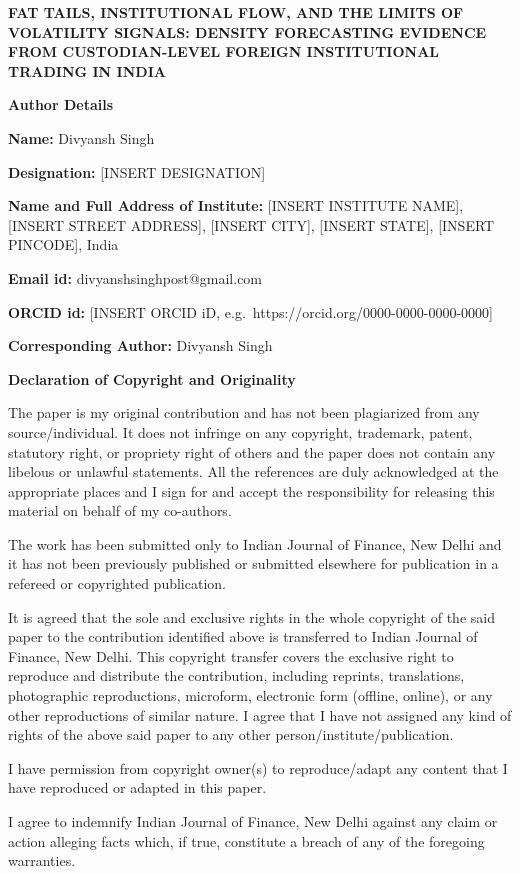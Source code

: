 \documentclass[12pt]{article}
\begin{document}
\begin{center}
{\bfseries FAT TAILS, INSTITUTIONAL FLOW, AND THE LIMITS OF VOLATILITY
SIGNALS: DENSITY FORECASTING EVIDENCE FROM CUSTODIAN-LEVEL FOREIGN
INSTITUTIONAL TRADING IN INDIA}
\end{center}

\vspace{1.5\baselineskip}

\noindent
\textbf{Author Details}

\vspace{0.5\baselineskip}

\noindent
\textbf{Name:} Divyansh Singh

\noindent
\textbf{Designation:} [INSERT DESIGNATION]

\noindent
\textbf{Name and Full Address of Institute:} [INSERT INSTITUTE NAME],
[INSERT STREET ADDRESS], [INSERT CITY], [INSERT STATE], [INSERT PINCODE],
India

\noindent
\textbf{Email id:} divyanshsinghpost@gmail.com

\noindent
\textbf{ORCID id:} [INSERT ORCID iD, e.g.\ https://orcid.org/0000-0000-0000-0000]

\vspace{1.5\baselineskip}

\noindent
\textbf{Corresponding Author:} Divyansh Singh

\newpage

\noindent
\textbf{Declaration of Copyright and Originality}

\vspace{0.5\baselineskip}

\noindent
The paper is my original contribution and has not been plagiarized from any
source/individual. It does not infringe on any copyright, trademark, patent,
statutory right, or propriety right of others and the paper does not contain
any libelous or unlawful statements. All the references are duly acknowledged
at the appropriate places and I sign for and accept the responsibility for
releasing this material on behalf of my co-authors.

\noindent
The work has been submitted only to Indian Journal of Finance, New Delhi and
it has not been previously published or submitted elsewhere for publication in
a refereed or copyrighted publication.

\noindent
It is agreed that the sole and exclusive rights in the whole copyright of the
said paper to the contribution identified above is transferred to Indian
Journal of Finance, New Delhi. This copyright transfer covers the exclusive
right to reproduce and distribute the contribution, including reprints,
translations, photographic reproductions, microform, electronic form (offline,
online), or any other reproductions of similar nature. I agree that I have not
assigned any kind of rights of the above said paper to any other
person/institute/publication.

\noindent
I have permission from copyright owner(s) to reproduce/adapt any content that
I have reproduced or adapted in this paper.

\noindent
I agree to indemnify Indian Journal of Finance, New Delhi against any claim or
action alleging facts which, if true, constitute a breach of any of the
foregoing warranties.
\end{document}
